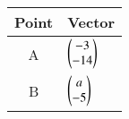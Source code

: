 \begin{tabular}{|c|p{3cm}|}
    \hline
    Point & Vector \\
    \hline
        A & $\begin{pmatrix}-3 \\ -14\end{pmatrix}$  \\
    \hline
        B & $\begin{pmatrix}a \\ -5\end{pmatrix}$ \\
    \hline
\end{tabular}
